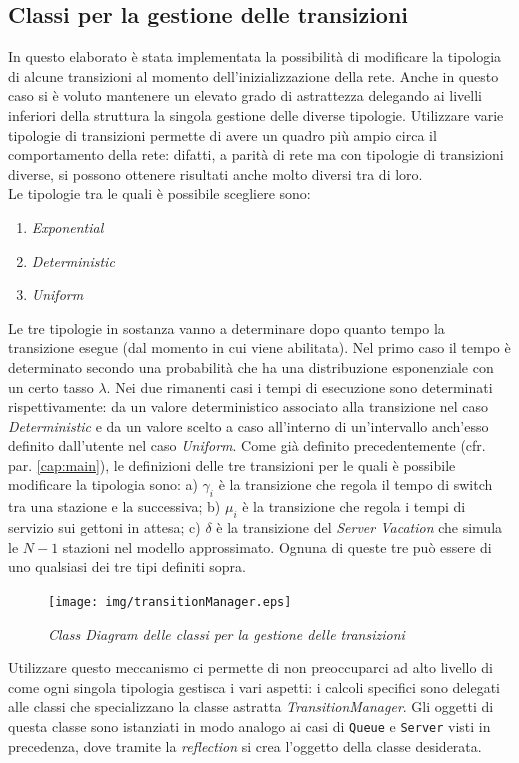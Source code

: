 \documentclass[12pt,a4paper,italian]{article}
\begin{document}
\subsection{Classi per la gestione delle transizioni}
In questo elaborato è stata implementata la possibilità di modificare la tipologia di alcune transizioni al momento dell'inizializzazione della rete. Anche in questo caso si è voluto mantenere un elevato grado di astrattezza delegando ai livelli inferiori della struttura la singola gestione delle diverse tipologie. Utilizzare varie tipologie di transizioni permette di avere un quadro più ampio circa il comportamento della rete: difatti, a parità di rete ma con tipologie di transizioni diverse, si possono ottenere risultati anche molto diversi tra di loro.\\
\newline
Le tipologie tra le quali è possibile scegliere sono: 
\begin{enumerate}
	\item \emph{Exponential}
	\item \emph{Deterministic}
	\item \emph{Uniform}
\end{enumerate}
Le tre tipologie in sostanza vanno a determinare dopo quanto tempo la transizione esegue (dal momento in cui viene abilitata).  Nel primo caso il tempo è determinato secondo una probabilità che ha una distribuzione esponenziale con un certo tasso $\lambda$. Nei due rimanenti casi i tempi di esecuzione sono determinati rispettivamente: da un valore deterministico associato alla transizione nel caso \emph{Deterministic} e da un valore scelto a caso all'interno di un'intervallo anch'esso definito dall'utente nel caso \emph{Uniform}.
Come già definito precedentemente (cfr. par. \ref{cap:main}), le definizioni delle tre transizioni per le quali è possibile modificare la tipologia sono: a) $\gamma_i$  è la transizione che regola il tempo di switch tra una stazione e la successiva; b) $\mu_i$ è la transizione che regola i tempi di servizio sui gettoni in attesa; c) $\delta$ è la transizione del \emph{Server Vacation} che simula le $N-1$ stazioni nel modello approssimato. Ognuna di queste tre può essere di uno qualsiasi dei tre tipi definiti sopra.
\begin{figure}[ht!]
	\centering
	\texttt{[image: img/transitionManager.eps]}
	\caption{\emph{Class Diagram delle classi per la gestione delle transizioni}}
	\label{transitionmanager}
\end{figure}		
Utilizzare questo meccanismo ci permette di non preoccuparci ad alto livello di come ogni singola tipologia gestisca i vari aspetti: i calcoli specifici sono delegati alle classi che specializzano la classe astratta \emph{TransitionManager}. Gli oggetti di questa classe sono istanziati in modo analogo ai casi di \texttt{Queue} e \texttt{Server} visti in precedenza, dove tramite la \emph{reflection} si crea l'oggetto della classe desiderata.
\end{document}
